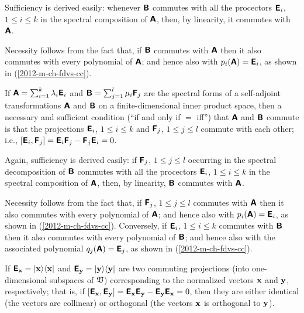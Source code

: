 {\color{OliveGreen}\bproof
Sufficiency is derived easily: whenever   $\textsf{\textbf{B}}$
commutes with all the procectors $\textsf{\textbf{E}}_i$, $1\le i\le k$
in the spectral composition of   $\textsf{\textbf{A}}$,
then, by linearity, it commutes with $\textsf{\textbf{A}}$.

Necessity follows from the fact that, if  $\textsf{\textbf{B}}$
commutes with  $\textsf{\textbf{A}}$
then it also commutes with every polynomial of  $\textsf{\textbf{A}}$;
and hence also with $p_i(\textsf{\textbf{A}})=\textsf{\textbf{E}}_i$,
as shown in (\ref{2012-m-ch-fdvs-cc}).
\eproof
}

If $\textsf{\textbf{A}}=\sum_{i=1}^k \lambda_i\textsf{\textbf{E}}_i$
and
$\textsf{\textbf{B}}=\sum_{j=1}^l \mu_i\textsf{\textbf{F}}_j$
are the spectral forms of a self-adjoint transformations
$\textsf{\textbf{A}}$ and $\textsf{\textbf{B}}$
on a finite-dimensional inner product space,
then a necessary and sufficient condition (``if and only if $=$ iff'')
that  $\textsf{\textbf{A}}$ and
 $\textsf{\textbf{B}}$ commute
is that the projections
$\textsf{\textbf{E}}_i$, $1\le i\le k$
and
$\textsf{\textbf{F}}_j$, $1\le j\le l$
commute with each other; i.e.,
$\left[\textsf{\textbf{E}}_i,\textsf{\textbf{F}}_j\right] =
\textsf{\textbf{E}}_i \textsf{\textbf{F}}_j-
\textsf{\textbf{F}}_j\textsf{\textbf{E}}_i =0 $.

{\color{OliveGreen}\bproof
Again, sufficiency is derived easily: if $\textsf{\textbf{F}}_j$, $1\le j\le l$
occurring in the spectral decomposition of $\textsf{\textbf{B}}$
commutes with all the procectors $\textsf{\textbf{E}}_i$, $1\le i\le k$
in the spectral composition of   $\textsf{\textbf{A}}$,
then, by linearity, $\textsf{\textbf{B}}$ commutes with $\textsf{\textbf{A}}$.

Necessity follows from the fact that, if $\textsf{\textbf{F}}_j$, $1\le j\le l$
commutes with  $\textsf{\textbf{A}}$
then it also commutes with every polynomial of  $\textsf{\textbf{A}}$;
and
hence also with $p_i(\textsf{\textbf{A}})=\textsf{\textbf{E}}_i$,
as shown in (\ref{2012-m-ch-fdvs-cc}).
Conversely,
if $\textsf{\textbf{E}}_i$, $1\le i\le k$
commutes with  $\textsf{\textbf{B}}$
then it also commutes with every polynomial of  $\textsf{\textbf{B}}$;
and
hence also with the associated polynomial
$q_j(\textsf{\textbf{A}})=\textsf{\textbf{E}}_j$,
as shown in (\ref{2012-m-ch-fdvs-cc}).
\eproof
}



If
$\textsf{\textbf{E}}_{\bf x} = \vert {\bf x} \rangle \langle {\bf x} \vert$
and
$\textsf{\textbf{E}}_{\bf y} = \vert {\bf y} \rangle \langle {\bf y} \vert$
are two commuting projections (into one-dimensional subspaces of ${\frak V}$)
corresponding to the normalized vectors ${\bf x}$  and ${\bf y}$,
respectively; that is, if
$\left[
\textsf{\textbf{E}}_{\bf x}
,
\textsf{\textbf{E}}_{\bf y}
\right]=
\textsf{\textbf{E}}_{\bf x}
\textsf{\textbf{E}}_{\bf y}
-
\textsf{\textbf{E}}_{\bf y}
\textsf{\textbf{E}}_{\bf x}
=0$,
then they are either identical (the vectors are collinear) or orthogonal (the vectors ${\bf x}$ is orthogonal to ${\bf y}$).


